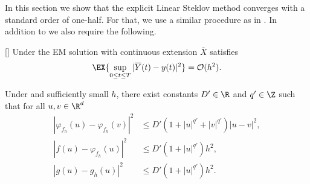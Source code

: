 	In this section we show that the explicit Linear Steklov method 
 converges  with a standard order of one-half. For that,
we use a similar procedure  as in  \cite{Higham2002b}. In addition 
to  we also require the following.
 
 

 \begin{thm}\label{thm:EulerConvergenceRateHMS}[{\citet[Thm 4.4]{Higham2002b}}]
 	Under  the EM solution with continuous extension $\overline{X}$
 	satisfies
 	\begin{equation}
 	\EX{
 		\sup_{0\leq t \leq T}
 		|\overline{Y}(t)- y(t)|^2
 	} = \mathcal{O}(h^2).
 	\end{equation}
 \end{thm}
  
\begin{lem}
	Under  and sufficiently small $h$, there exist
	constants $D'\in \R$ and $q'\in \Z$ such that for all $u,v\in \R^d$
	\begin{align}
		|
			\varphi_{f_h}(u)
			-\varphi_{f_h}(v)
		|^2 
		&\leq
			D'
			\left(
				1 +|u|^{q'} +|v|^{q'}
			\right)
			|u-v|^2, \\
		|
			 f(u) -\varphi_{f_h}(u)
		|^2 
		&\leq
			D'
			\left(
				1 +|u|^{q'} 
				\right)
			h^2, \\
		|
			g(u) -g_h(u)
		|^2 				 
		&\leq
			D'
			\left(
				1 +|u|^{q'} 
			\right)
			h^2 . \label{eqn:ghPolyGrowth}
	\end{align}
\end{lem}


